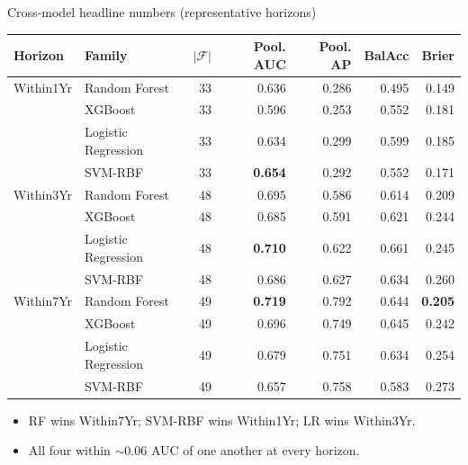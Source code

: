 \documentclass[10pt,aspectratio=169]{beamer}
\begin{document}
\begin{frame}{Cross-model headline numbers (representative horizons)}
  \scriptsize
  \begin{center}
  \begin{tabular}{llrrrrr}
    \toprule
    Horizon & Family & $|\mathcal{F}|$ & Pool. AUC & Pool. AP & BalAcc & Brier \\
    \midrule
    Within1Yr & Random Forest       & 33 & 0.636 & 0.286 & 0.495 & 0.149 \\
              & XGBoost             & 33 & 0.596 & 0.253 & 0.552 & 0.181 \\
              & Logistic Regression & 33 & 0.634 & 0.299 & 0.599 & 0.185 \\
              & SVM-RBF             & 33 & \textbf{0.654} & 0.292 & 0.552 & 0.171 \\
    \midrule
    Within3Yr & Random Forest       & 48 & 0.695 & 0.586 & 0.614 & 0.209 \\
              & XGBoost             & 48 & 0.685 & 0.591 & 0.621 & 0.244 \\
              & Logistic Regression & 48 & \textbf{0.710} & 0.622 & 0.661 & 0.245 \\
              & SVM-RBF             & 48 & 0.686 & 0.627 & 0.634 & 0.260 \\
    \midrule
    Within7Yr & Random Forest       & 49 & \textbf{0.719} & 0.792 & 0.644 & \textbf{0.205} \\
              & XGBoost             & 49 & 0.696 & 0.749 & 0.645 & 0.242 \\
              & Logistic Regression & 49 & 0.679 & 0.751 & 0.634 & 0.254 \\
              & SVM-RBF             & 49 & 0.657 & 0.758 & 0.583 & 0.273 \\
    \bottomrule
  \end{tabular}
  \end{center}
  \vspace{0.4em}
  \begin{itemize}
    \item RF wins Within7Yr; SVM-RBF wins Within1Yr; LR wins Within3Yr.
    \item All four within $\sim 0.06$ AUC of one another at every horizon.
  \end{itemize}
\end{frame}
\end{document}
